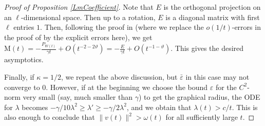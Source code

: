 \documentclass[11pt]{amsart}
\numberwithin{equation}{section}
\numberwithin{equation}{section}
\newcommand{\eps}{\varepsilon}
\begin{document}
\begin{proof}[Proof of Proposition \ref{LmCoefficient}]
		Note that $E$ is the orthogonal projection on an $\ell$-dimensional space. Then up to a rotation, $E$ is a diagonal matrix with first $\ell$ entries $1$. Then, following the proof in \cite[Lemma 3.6]{V2} (where we replace the $o(1/t)$-errors in the proof of \cite{V2} by the explicit errors here), we get $\mathrm{M}(t)=-\frac{P_{W(t)}}{\gamma t}+O(t^{-2-2\vartheta})=-\frac{E}{\gamma t}+O(t^{-1-\vartheta})$. This gives the desired asymptotics. 
		
		Finally, if $\kappa=1/2$, we repeat the above discussion, but $\bar\eps$ in this case may not converge to $0$. However, if at the beginning we choose the bound $\eps$ for the $C^2$-norm very small (say, much smaller than $\gamma$) to get the graphical radius, the ODE for $\lambda$ becomes $-\gamma/10 \lambda^2\geq \lambda'\geq -\gamma/2 \lambda^2$, and we obtain that $\lambda(t)>c/t$. This is also enough to conclude that $\|v(t)\|^2>\omega(t)$ for all sufficiently large $t$.
	\end{proof}
\end{document}
